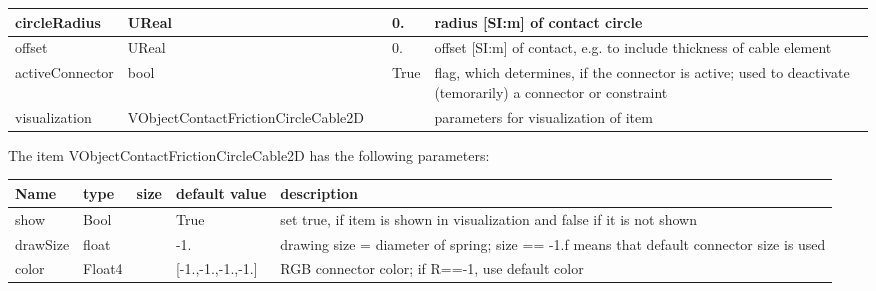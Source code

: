 \begin{center}
\begin{longtable}{| p{4.5cm} | p{2.5cm} | p{0.5cm} | p{2.5cm} | p{6cm} |}
    circleRadius &     UReal &      &     0. &     radius [SI:m] of contact circle\\ \hline
    offset &     UReal &      &     0. &     offset [SI:m] of contact, e.g. to include thickness of cable element\\ \hline
    activeConnector &     bool &      &     True &     flag, which determines, if the connector is active; used to deactivate (temorarily) a connector or constraint\\ \hline
    visualization & VObjectContactFrictionCircleCable2D & & & parameters for visualization of item \\ \hline
	  \end{longtable}
	\end{center}
The item VObjectContactFrictionCircleCable2D has the following parameters:
\begin{center}
  \footnotesize
  \begin{longtable}{| p{4.5cm} | p{2.5cm} | p{0.5cm} | p{2.5cm} | p{6cm} |}
    \hline
    \bf Name & \bf type & \bf size & \bf default value & \bf description \\ \hline
    show &     Bool &      &     True &     set true, if item is shown in visualization and false if it is not shown\\ \hline
    drawSize &     float &      &     -1. &     drawing size = diameter of spring; size == -1.f means that default connector size is used\\ \hline
    color &     Float4 &      &     [-1.,-1.,-1.,-1.] &     RGB connector color; if R==-1, use default color\\ \hline
	  \end{longtable}
	\end{center}

